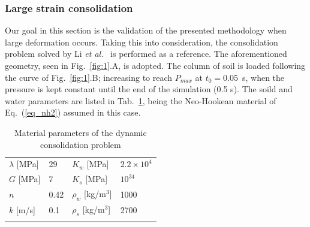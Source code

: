 \documentclass[twocolumn]{svjour3}          %
\begin{document}
\subsubsection{Large strain consolidation}
\label{sec:5:1:1}

Our goal in this section is the validation of the presented methodology when large deformation occurs. Taking this into consideration, the consolidation problem solved by Li \textit{et al.}~\cite{LiBorja2004}  is performed as a reference. The aforementioned geometry, seen in Fig.~\ref{fig:1}.A, is adopted. The column of soil is loaded following the curve of Fig.~\ref{fig:1}.B; increasing to reach $P_{max}$ at $t_0=0.05$~s, when the pressure is kept constant until the end of the simulation (0.5 s). The soild and water parameters are listed in Tab.~\ref{tab:4}, being the Neo-Hookean material of Eq.~(\ref{eq_nh2}) assumed in this case. 
\begin{table}
\centering
\caption{ Material parameters of the dynamic consolidation problem} \label{tab:4}
	\vspace*{0.2cm}
	\begin{tabular}{ll | ll}
	\hline\noalign{\smallskip}
	$\lambda$ [MPa] & 29 & $K_w$ [MPa] & $2.2 \times 10^4$ \\
		\noalign{\smallskip}\hline\noalign{\smallskip}
	$G$ [MPa] & 7 & $K_s$ [MPa] & $10^{34}$ \\
			\noalign{\smallskip}\hline\noalign{\smallskip}
	$n$ & 0.42 & $\rho_w$ [kg/$\textrm{m}^3$] & 1000 \\
				\noalign{\smallskip}\hline\noalign{\smallskip}
	$k$ [m/s] & 0.1 & $\rho_s$ [kg/$\textrm{m}^3$] & 2700 \\
\hline\noalign{\smallskip}
	\end{tabular}
\end{table}
\end{document}
